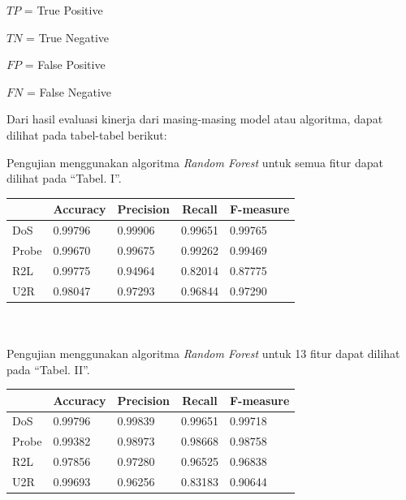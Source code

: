 \documentclass[conference]{IEEEtran}
\begin{document}
\noindent $TP$ = True Positive

\noindent $TN$ = True Negative

\noindent $FP$ = False Positive

\noindent $FN$ = False Negative
\vspace{6pt}

Dari hasil evaluasi kinerja dari masing-masing model atau algoritma, dapat dilihat pada tabel-tabel berikut:

\noindent Pengujian menggunakan algoritma \emph{Random Forest} untuk semua fitur dapat dilihat pada ``Tabel. I''.\vspace{6pt}

\begin{minipage}{\linewidth}
\begin{center}
\begin{tabular}{|l|l|l|l|l|}
\hline
\multicolumn{1}{|c|}{\textbf{}}&\multicolumn{1}{|c|}{\textbf{Accuracy}}&\multicolumn{1}{|c|}{\textbf{Precision}}&\multicolumn{1}{|c|}{\textbf{Recall}}&\multicolumn{1}{|c|}{\textbf{F-measure}} \\
\hline
DoS & 0.99796 & 0.99906 & 0.99651 & 0.99765\\
\hline
Probe & 0.99670 & 0.99675 & 0.99262 & 0.99469\\
\hline
R2L & 0.99775 & 0.94964 & 0.82014 & 0.87775\\
\hline
U2R & 0.98047 & 0.97293 & 0.96844 & 0.97290\\
\hline
\end{tabular}
\label{tab1}
\end{center}
\end{minipage}\\ \\

\noindent Pengujian menggunakan algoritma \emph{Random Forest} untuk 13 fitur dapat dilihat pada ``Tabel. II''.\vspace{6pt}

\begin{minipage}{\linewidth}
\begin{center}
\begin{tabular}{|l|l|l|l|l|}
\hline
\multicolumn{1}{|c|}{\textbf{}}&\multicolumn{1}{|c|}{\textbf{Accuracy}}&\multicolumn{1}{|c|}{\textbf{Precision}}&\multicolumn{1}{|c|}{\textbf{Recall}}&\multicolumn{1}{|c|}{\textbf{F-measure}} \\
\hline
DoS & 0.99796 & 0.99839 & 0.99651 & 0.99718\\
\hline
Probe & 0.99382 & 0.98973 & 0.98668 & 0.98758\\
\hline
R2L & 0.97856 & 0.97280 & 0.96525 & 0.96838\\
\hline
U2R & 0.99693 & 0.96256 & 0.83183 & 0.90644\\
\hline
\end{tabular}
\label{tab2}
\end{center}
\end{minipage}\\ \\
\end{document}
